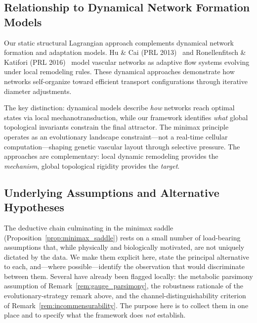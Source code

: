 \subsection{Relationship to Dynamical Network Formation Models}

Our static structural Lagrangian approach complements dynamical network
formation and adaptation models. Hu \& Cai (PRL 2013)~\cite{hucai2013} and
Ronellenfitsch \& Katifori (PRL 2016)~\cite{ronellenfitsch2016} model vascular
networks as adaptive flow systems evolving under local remodeling rules. These
dynamical approaches demonstrate how networks self-organize toward efficient
transport configurations through iterative diameter adjustments.

The key distinction: dynamical models describe \textit{how} networks reach
optimal states via local mechanotransduction, while our framework identifies
\textit{what} global topological invariants constrain the final attractor. The
minimax principle operates as an evolutionary landscape constraint---not a
real-time cellular computation---shaping genetic vascular layout through
selective pressure. The approaches are complementary: local dynamic remodeling
provides the \textit{mechanism}, global topological rigidity provides the
\textit{target}.

\subsection{Underlying Assumptions and Alternative Hypotheses}
\label{sec:assumptions}

The deductive chain culminating in the minimax saddle
(Proposition~\ref{prop:minimax_saddle}) rests on a small number of load-bearing
assumptions that, while physically and biologically motivated, are not uniquely
dictated by the data. We make them explicit here, state the principal
alternative to each, and---where possible---identify the observation that would
discriminate between them. Several have already been flagged locally: the
metabolic parsimony assumption of Remark~\ref{rem:gauge_parsimony}, the
robustness rationale of the evolutionary-strategy remark above, and the
channel-distinguishability criterion of Remark~\ref{rem:incommensurability}. The
purpose here is to collect them in one place and to specify what the
framework does \emph{not} establish.

